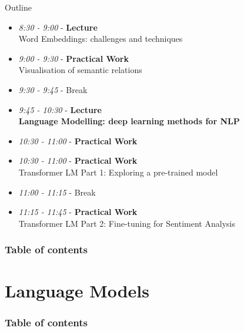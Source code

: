 \documentclass[UKenglish]{beamer}
\begin{document}
\begin{frame}{Outline}
    \begin{itemize}
        \item \textit{8:30 - 9:00} - \textbf{Lecture} \\
        Word Embeddings: challenges and techniques
        \item \textit{9:00 - 9:30} - \textbf{Practical Work} \\
        Visualisation of semantic relations
        \item \textit{9:30 - 9:45} - Break
        \item \textit{9:45 - 10:30} - \textbf{Lecture}\\
        \textbf{Language Modelling: deep learning methods for NLP}
        \item \textit{10:30 - 11:00} - \textbf{Practical Work} \\
        \item \textit{10:30 - 11:00} - \textbf{Practical Work} \\
        Transformer LM Part 1: Exploring a pre-trained model
        \item \textit{11:00 - 11:15} - Break
        \item \textit{11:15 - 11:45} - \textbf{Practical Work} \\
        Transformer LM Part 2: Fine-tuning for Sentiment Analysis
    \end{itemize}
\end{frame}

\begin{frame}
    \frametitle{Table of contents}
    \tableofcontents
\end{frame}

\section{Language Models}
\begin{frame}
    \frametitle{Table of contents}
    \tableofcontents[currentsection]
\end{frame}
\end{document}
